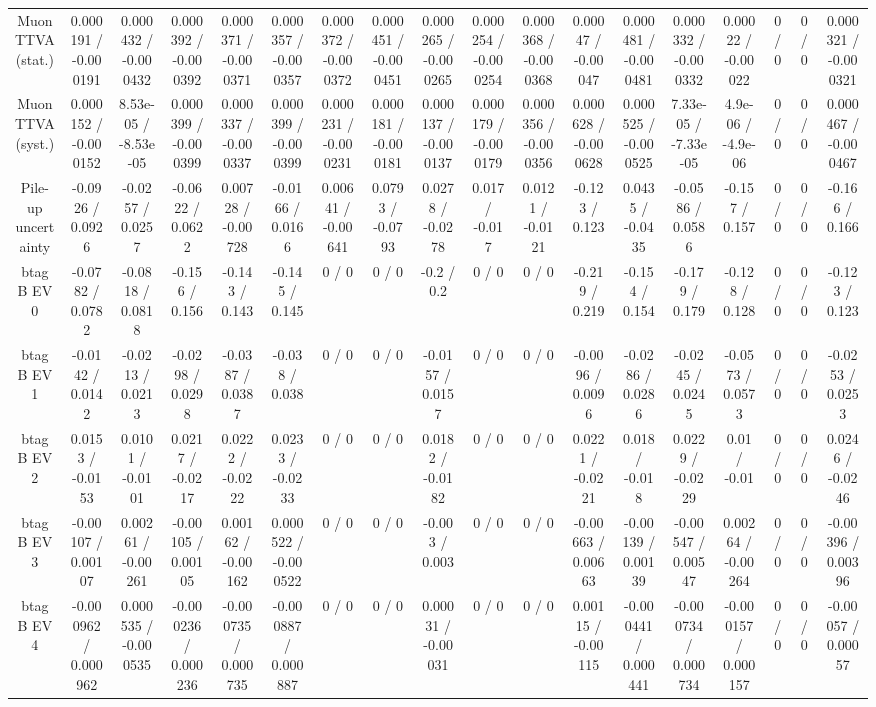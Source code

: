 \documentclass[10pt]{article}
\begin{document}
\begin{table}[htbp]
\begin{center}
\begin{tabular}{|c|c|c|c|c|c|c|c|c|c|c|c|c|c|c|c|c|c|}
  Muon TTVA (stat.) & 0.000191 / -0.000191 & 0.000432 / -0.000432 & 0.000392 / -0.000392 & 0.000371 / -0.000371 & 0.000357 / -0.000357 & 0.000372 / -0.000372 & 0.000451 / -0.000451 & 0.000265 / -0.000265 & 0.000254 / -0.000254 & 0.000368 / -0.000368 & 0.00047 / -0.00047 & 0.000481 / -0.000481 & 0.000332 / -0.000332 & 0.00022 / -0.00022 & 0 / 0 & 0 / 0 & 0.000321 / -0.000321 \\ 
  Muon TTVA (syst.) & 0.000152 / -0.000152 & 8.53e-05 / -8.53e-05 & 0.000399 / -0.000399 & 0.000337 / -0.000337 & 0.000399 / -0.000399 & 0.000231 / -0.000231 & 0.000181 / -0.000181 & 0.000137 / -0.000137 & 0.000179 / -0.000179 & 0.000356 / -0.000356 & 0.000628 / -0.000628 & 0.000525 / -0.000525 & 7.33e-05 / -7.33e-05 & 4.9e-06 / -4.9e-06 & 0 / 0 & 0 / 0 & 0.000467 / -0.000467 \\ 
  Pile-up uncertainty & -0.0926 / 0.0926 & -0.0257 / 0.0257 & -0.0622 / 0.0622 & 0.00728 / -0.00728 & -0.0166 / 0.0166 & 0.00641 / -0.00641 & 0.0793 / -0.0793 & 0.0278 / -0.0278 & 0.017 / -0.017 & 0.0121 / -0.0121 & -0.123 / 0.123 & 0.0435 / -0.0435 & -0.0586 / 0.0586 & -0.157 / 0.157 & 0 / 0 & 0 / 0 & -0.166 / 0.166 \\ 
  btag B EV 0 & -0.0782 / 0.0782 & -0.0818 / 0.0818 & -0.156 / 0.156 & -0.143 / 0.143 & -0.145 / 0.145 & 0 / 0 & 0 / 0 & -0.2 / 0.2 & 0 / 0 & 0 / 0 & -0.219 / 0.219 & -0.154 / 0.154 & -0.179 / 0.179 & -0.128 / 0.128 & 0 / 0 & 0 / 0 & -0.123 / 0.123 \\ 
  btag B EV 1 & -0.0142 / 0.0142 & -0.0213 / 0.0213 & -0.0298 / 0.0298 & -0.0387 / 0.0387 & -0.038 / 0.038 & 0 / 0 & 0 / 0 & -0.0157 / 0.0157 & 0 / 0 & 0 / 0 & -0.0096 / 0.0096 & -0.0286 / 0.0286 & -0.0245 / 0.0245 & -0.0573 / 0.0573 & 0 / 0 & 0 / 0 & -0.0253 / 0.0253 \\ 
  btag B EV 2 & 0.0153 / -0.0153 & 0.0101 / -0.0101 & 0.0217 / -0.0217 & 0.0222 / -0.0222 & 0.0233 / -0.0233 & 0 / 0 & 0 / 0 & 0.0182 / -0.0182 & 0 / 0 & 0 / 0 & 0.0221 / -0.0221 & 0.018 / -0.018 & 0.0229 / -0.0229 & 0.01 / -0.01 & 0 / 0 & 0 / 0 & 0.0246 / -0.0246 \\ 
  btag B EV 3 & -0.00107 / 0.00107 & 0.00261 / -0.00261 & -0.00105 / 0.00105 & 0.00162 / -0.00162 & 0.000522 / -0.000522 & 0 / 0 & 0 / 0 & -0.003 / 0.003 & 0 / 0 & 0 / 0 & -0.00663 / 0.00663 & -0.00139 / 0.00139 & -0.00547 / 0.00547 & 0.00264 / -0.00264 & 0 / 0 & 0 / 0 & -0.00396 / 0.00396 \\ 
  btag B EV 4 & -0.000962 / 0.000962 & 0.000535 / -0.000535 & -0.000236 / 0.000236 & -0.000735 / 0.000735 & -0.000887 / 0.000887 & 0 / 0 & 0 / 0 & 0.00031 / -0.00031 & 0 / 0 & 0 / 0 & 0.00115 / -0.00115 & -0.000441 / 0.000441 & -0.000734 / 0.000734 & -0.000157 / 0.000157 & 0 / 0 & 0 / 0 & -0.00057 / 0.00057 \\ 

\end{tabular}
\end{center}
\end{table}
\end{document}
